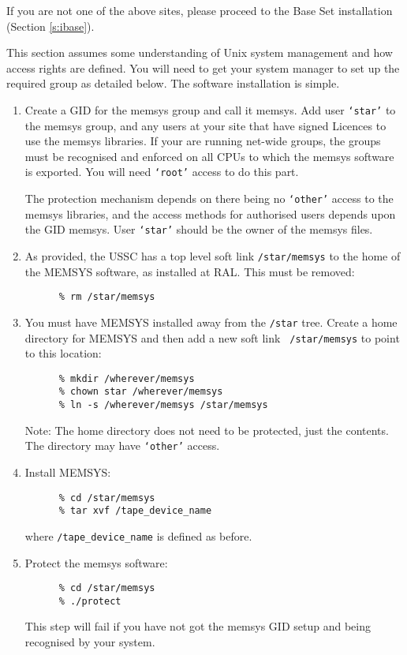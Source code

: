 If you are not one of the above sites, please proceed to the Base Set
installation (Section \ref{s:ibase}).

This section assumes some understanding of Unix system management and
how access rights are defined.  You will need to get your system manager
to set up the required group as detailed below.  The software installation
is simple.

\begin{enumerate}

\item Create a GID for the memsys group and call it memsys. Add user
{\tt `star'} to the memsys group, and any users at your site that have
signed Licences to use the memsys libraries. If your are running
net-wide groups, the groups must be recognised and enforced on all CPUs
to which the memsys software is exported. You will need {\tt `root'}
access to do this part.

The protection mechanism depends on there being no {\tt `other'} access
to the memsys libraries, and the access methods for authorised users
depends upon the GID memsys.  User {\tt `star'} should be the owner of the
memsys files.

\item As provided, the USSC has a top level soft link {\tt /star/memsys} to
the home of the MEMSYS software, as installed at RAL.  This must be
removed:

\begin{verbatim}
      % rm /star/memsys
\end{verbatim}

\item You must have MEMSYS installed away from the {\tt /star} tree.
Create a home directory for MEMSYS and then add a new soft link {\tt
/star/memsys} to point to this location:

\begin{verbatim}
      % mkdir /wherever/memsys
      % chown star /wherever/memsys
      % ln -s /wherever/memsys /star/memsys
\end{verbatim}

Note: The home directory does not need to be protected, just the
contents.  The directory may have {\tt `other'} access.

\item Install MEMSYS:

\begin{verbatim}
      % cd /star/memsys
      % tar xvf /tape_device_name
\end{verbatim}

where \verb+/tape_device_name+ is defined as before.

\item Protect the memsys software:

\begin{verbatim}
      % cd /star/memsys
      % ./protect
\end{verbatim}

This step will fail if you have not got the memsys GID setup and being
recognised by your system.

\end{enumerate}

